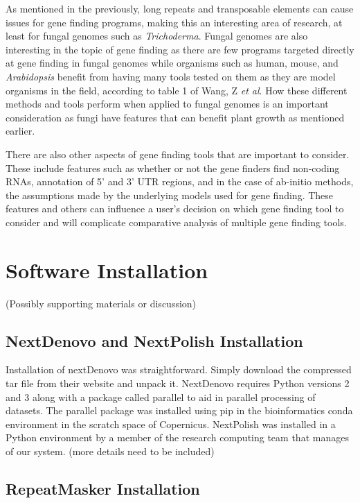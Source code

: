\documentclass[12pt]{article}
\begin{document}
As mentioned in the previously, long repeats and transposable elements
can cause issues for gene finding programs, making this an interesting
area of research, at least for fungal genomes such as
\textit{Trichoderma}. Fungal genomes are also interesting in the topic
of gene finding as there are few programs targeted directly at gene
finding in fungal genomes while organisms such as human, mouse, and
\textit{Arabidopsis} benefit from having many tools tested on them as
they are model organisms in the field, according to table 1 of Wang, Z
\textit{et al}\cite{GeneFinding}. How these different methods and
tools perform when applied to fungal genomes is an important
consideration as fungi have features that can benefit plant growth as
mentioned earlier.

There are also other aspects of gene finding tools that are important
to consider. These include features such as whether or not the gene
finders find non-coding RNAs, annotation of 5' and 3' UTR regions, and
in the case of ab-initio methods, the assumptions made by the
underlying models used for gene finding. These features and others can
influence a user's decision on which gene finding tool to consider and
will complicate comparative analysis of multiple gene finding tools.

\section{Software Installation}
(Possibly supporting materials or discussion)

\subsection{NextDenovo and NextPolish Installation}
Installation of nextDenovo was straightforward. Simply download the
compressed tar file from their website and unpack it. NextDenovo
requires Python versions 2 and 3 along with a package called parallel
to aid in parallel processing of datasets. The parallel package was
installed using pip in the bioinformatics conda environment in the
scratch space of Copernicus. NextPolish was installed in a Python
environment by a member of the research computing team that manages of
our system. (more details need to be included)

\subsection{RepeatMasker Installation}
\end{document}
